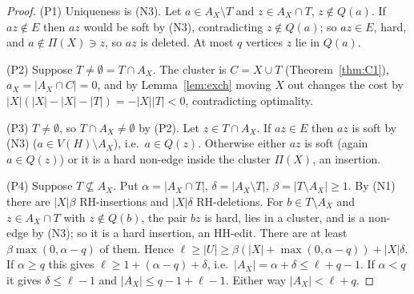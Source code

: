 \begin{proof}
(P1) Uniqueness is (N3). Let $a\in A_X\setminus T$ and $z\in A_X\cap T$, $z\notin Q(a)$. If $az\notin E$ then $az$ would be soft by (N3), contradicting $z\notin Q(a)$; so $az\in E$, hard, and $a\notin\Pi(X)\ni z$, so $az$ is deleted. At most $q$ vertices $z$ lie in $Q(a)$.

(P2) Suppose $T\ne\emptyset=T\cap A_X$. The cluster is $C=X\cup T$ (Theorem~\ref{thm:C1}), $a_X=|A_X\cap C|=0$, and by Lemma~\ref{lem:exch} moving $X$ out changes the cost by $|X|(|X|-|X|-|T|)=-|X||T|<0$, contradicting optimality.

(P3) $T\neq\emptyset$, so $T\cap A_X\ne\emptyset$ by (P2). Let $z\in T\cap A_X$. If $az\in E$ then $az$ is soft by (N3) ($a\in V(H)\setminus A_X$), i.e.\ $a\in Q(z)$. Otherwise either $az$ is soft (again $a\in Q(z)$) or it is a hard non-edge inside the cluster $\Pi(X)$, an insertion.

(P4) Suppose $T\not\subseteq A_X$. Put $\alpha=|A_X\cap T|$, $\delta=|A_X\setminus T|$, $\beta=|T\setminus A_X|\ge1$. By (N1) there are $|X|\beta$ RH-insertions and $|X|\delta$ RH-deletions. For $b\in T\setminus A_X$ and $z\in A_X\cap T$ with $z\notin Q(b)$, the pair $bz$ is hard, lies in a cluster, and is a non-edge by (N3); so it is a hard insertion, an HH-edit. There are at least $\beta\max(0,\alpha-q)$ of them. Hence $\ell\ge|U|\ge\beta(|X|+\max(0,\alpha-q))+|X|\delta$. If $\alpha\ge q$ this gives $\ell\ge1+(\alpha-q)+\delta$, i.e.\ $|A_X|=\alpha+\delta\le\ell+q-1$. If $\alpha<q$ it gives $\delta\le\ell-1$ and $|A_X|\le q-1+\ell-1$. Either way $|A_X|<\ell+q$.
\end{proof}

